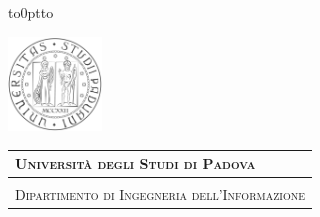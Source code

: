 \documentclass[12pt]{report}
\title{\ThesisTitle}
\author{\ThesisAuthor}
\date{}
\begin{document}

	\setcounter{page}{0}                  %
	\renewcommand{\thepage}{\roman{page}} %
	\begin{titlepage}
		\begin{center}
			\vbox to0pt{\vbox to\vss}

			\hspace{0.5cm}
			\begin{minipage}{.20\textwidth}
  				\includegraphics[height=2.5cm]{./figures/unipd-bn}
			\end{minipage}\begin{minipage}{.90\textwidth}
  				\begin{table}[H]
  					\begin{tabular}{l}
  						\scshape{\Large{\bfseries{Università degli Studi di Padova}}} \\
  						\hline \\
  						\scshape{\large{Dipartimento di Ingegneria dell'Informazione}} \\
  					\end{tabular}
  				\end{table}
			\end{minipage}


\end{center}
\end{titlepage}
\end{document}

